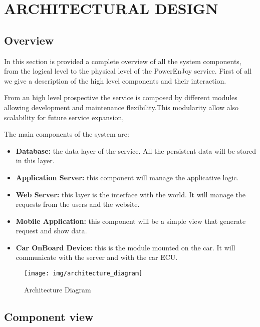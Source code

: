 \section{ARCHITECTURAL DESIGN}
\subsection{Overview} 
In this section is provided a complete overview of all the system components, from the logical level to the physical level of the PowerEnJoy service. First of all we give a description of the high level components and their interaction.\newline

\noindent From an high level prospective the service is composed by different modules allowing development and maintenance flexibility.This modularity allow also scalability for future service expansion,  \newline

\noindent The main components of the system are:
\begin{itemize}
\item{\textbf{Database:}} the data layer of the service. All the persistent data will be stored in this layer.
\item{\textbf{Application Server:}} this component will manage the applicative logic.
\item{\textbf{Web Server:}} this layer is the interface with the world. It will manage the requests from the users and the website.
\item{\textbf{Mobile Application:}} this component will be a simple view that generate request and show data. 
\item{\textbf{Car OnBoard Device:}} this is the module mounted on the car. It will communicate with the server and with the car ECU.
\end{itemize}

	\begin{figure}[H]	
	\centering
	\texttt{[image: img/architecture\_diagram]}
	\caption{Architecture Diagram}
\end{figure}




\subsection{Component view} 


